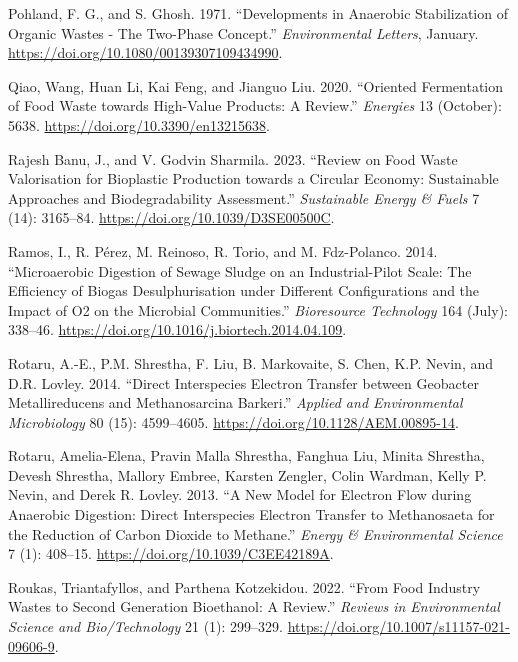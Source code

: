 \documentclass[11pt]{report}
\begin{document}
\begin{hangparas}{1.5em}{1}
\hypertarget{citeproc_bib_item_56}{Pohland, F. G., and S. Ghosh. 1971. “Developments in Anaerobic Stabilization of Organic Wastes - The Two-Phase Concept.” \textit{Environmental Letters}, January. \url{https://doi.org/10.1080/00139307109434990}.}

\hypertarget{citeproc_bib_item_57}{Qiao, Wang, Huan Li, Kai Feng, and Jianguo Liu. 2020. “Oriented Fermentation of Food Waste towards High-Value Products: A Review.” \textit{Energies} 13 (October): 5638. \url{https://doi.org/10.3390/en13215638}.}

\hypertarget{citeproc_bib_item_58}{Rajesh Banu, J., and V. Godvin Sharmila. 2023. “Review on Food Waste Valorisation for Bioplastic Production towards a Circular Economy: Sustainable Approaches and Biodegradability Assessment.” \textit{Sustainable Energy \& Fuels} 7 (14): 3165–84. \url{https://doi.org/10.1039/D3SE00500C}.}

\hypertarget{citeproc_bib_item_59}{Ramos, I., R. Pérez, M. Reinoso, R. Torio, and M. Fdz-Polanco. 2014. “Microaerobic Digestion of Sewage Sludge on an Industrial-Pilot Scale: The Efficiency of Biogas Desulphurisation under Different Configurations and the Impact of O2 on the Microbial Communities.” \textit{Bioresource Technology} 164 (July): 338–46. \url{https://doi.org/10.1016/j.biortech.2014.04.109}.}

\hypertarget{citeproc_bib_item_60}{Rotaru, A.-E., P.M. Shrestha, F. Liu, B. Markovaite, S. Chen, K.P. Nevin, and D.R. Lovley. 2014. “Direct Interspecies Electron Transfer between Geobacter Metallireducens and Methanosarcina Barkeri.” \textit{Applied and Environmental Microbiology} 80 (15): 4599–4605. \url{https://doi.org/10.1128/AEM.00895-14}.}

\hypertarget{citeproc_bib_item_61}{Rotaru, Amelia-Elena, Pravin Malla Shrestha, Fanghua Liu, Minita Shrestha, Devesh Shrestha, Mallory Embree, Karsten Zengler, Colin Wardman, Kelly P. Nevin, and Derek R. Lovley. 2013. “A New Model for Electron Flow during Anaerobic Digestion: Direct Interspecies Electron Transfer to Methanosaeta for the Reduction of Carbon Dioxide to Methane.” \textit{Energy \& Environmental Science} 7 (1): 408–15. \url{https://doi.org/10.1039/C3EE42189A}.}

\hypertarget{citeproc_bib_item_62}{Roukas, Triantafyllos, and Parthena Kotzekidou. 2022. “From Food Industry Wastes to Second Generation Bioethanol: A Review.” \textit{Reviews in Environmental Science and Bio/Technology} 21 (1): 299–329. \url{https://doi.org/10.1007/s11157-021-09606-9}.}


\end{hangparas}
\end{document}
